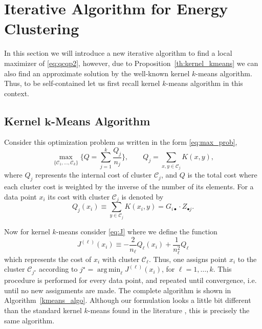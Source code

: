 \documentclass[aps,preprint,nofootinbib,floatfix]{revtex4-1}
\DeclareMathOperator*{\argmin}{arg\,min}
\newcommand\kk{K}
\newcommand\C{{\mathcal{C}}}
\begin{document}
\section{Iterative Algorithm for Energy Clustering}
\label{sec:algo}

In this section we will introduce a new iterative algorithm to find a local
maximizer of \eqref{eq:qcqp2}, however, due to 
Proposition~\ref{th:kernel_kmeans} we can also find an approximate
solution by the well-known kernel $k$-means algorithm. Thus, to be
self-contained let us first recall kernel $k$-means algorithm in this
context.

\subsection{Kernel $\bm{k}$-Means Algorithm}

Consider this optimization problem as
written in the form \eqref{eq:max_prob},
\begin{equation}
\label{eq:maxQ}
\max_{\{ \C_1,\dotsc,\C_k \}} 
\bigg\{ Q = \sum_{j=1}^k \dfrac{Q_j}{n_j}  \bigg\},
\qquad Q_j = \sum_{x,y\in\C_j} \kk(x,y),
\end{equation}
where $Q_j$ represents the internal cost of cluster $\C_j$, and
$Q$ is the total cost where each cluster cost 
is weighted by the inverse
of the number of its elements. For a data point $x_i$ its cost
with cluster $\C_j$ is denoted by
\begin{equation}
\label{eq:costxij}
Q_j(x_i) \equiv \sum_{y\in\C_j} \kk(x_i, y) = 
G_{i \bullet} \cdot Z_{\bullet j}.
\end{equation}

Now for kernel $k$-means 
consider \eqref{eq:J} where we define
the function
\begin{equation}
\label{eq:Jell}
J^{(\ell)}(x_i) \equiv -\dfrac{2}{n_\ell} Q_\ell(x_i) + \dfrac{1}{n_\ell^2}
Q_\ell
\end{equation}
which represents the cost of $x_i$ with cluster $\C_\ell$. Thus,
one assigns point $x_i$ to the cluster $\C_{j^\star}$ according
to $j^\star = \argmin_\ell J^{(\ell)}(x_i)$, for $\ell = 1,\dotsc,k$.
This procedure is performed for every data point, and repeated until
convergence, i.e. until no new assignments are made.
The complete algorithm is shown in Algorithm~\ref{kmeans_algo}.
Although our formulation looks a little bit different than the standard
kernel $k$-means found in the literature \cite{Dhillon}, this is precisely
the same algorithm.
\end{document}
